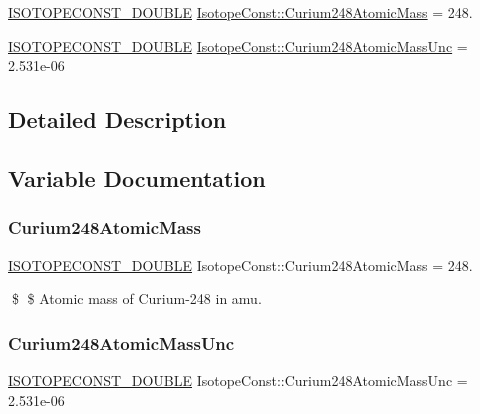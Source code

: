 \begin{DoxyCompactItemize}
\item 
\mbox{\hyperlink{group___isotope_const-_macros_ga8f45a7272ce02c0b4c65c44636ed719a}{I\+S\+O\+T\+O\+P\+E\+C\+O\+N\+S\+T\+\_\+\+D\+O\+U\+B\+LE}} \mbox{\hyperlink{group___isotope_const-_curium-_cm248_ga37872b007439d089090cfbbb61a7fd7b}{Isotope\+Const\+::\+Curium248\+Atomic\+Mass}} = 248.
\item 
\mbox{\hyperlink{group___isotope_const-_macros_ga8f45a7272ce02c0b4c65c44636ed719a}{I\+S\+O\+T\+O\+P\+E\+C\+O\+N\+S\+T\+\_\+\+D\+O\+U\+B\+LE}} \mbox{\hyperlink{group___isotope_const-_curium-_cm248_ga48223966180c01a622d9df44e60d3a36}{Isotope\+Const\+::\+Curium248\+Atomic\+Mass\+Unc}} = 2.\+531e-\/06
\end{DoxyCompactItemize}


\subsection{Detailed Description}


\subsection{Variable Documentation}
\mbox{\label{group___isotope_const-_curium-_cm248_ga37872b007439d089090cfbbb61a7fd7b}} 
\subsubsection{\texorpdfstring{Curium248\+Atomic\+Mass}{Curium248AtomicMass}}
{\footnotesize\ttfamily \mbox{\hyperlink{group___isotope_const-_macros_ga8f45a7272ce02c0b4c65c44636ed719a}{I\+S\+O\+T\+O\+P\+E\+C\+O\+N\+S\+T\+\_\+\+D\+O\+U\+B\+LE}} Isotope\+Const\+::\+Curium248\+Atomic\+Mass = 248.}

\$ \$ Atomic mass of Curium-\/248 in amu. \mbox{\label{group___isotope_const-_curium-_cm248_ga48223966180c01a622d9df44e60d3a36}} 
\subsubsection{\texorpdfstring{Curium248\+Atomic\+Mass\+Unc}{Curium248AtomicMassUnc}}
{\footnotesize\ttfamily \mbox{\hyperlink{group___isotope_const-_macros_ga8f45a7272ce02c0b4c65c44636ed719a}{I\+S\+O\+T\+O\+P\+E\+C\+O\+N\+S\+T\+\_\+\+D\+O\+U\+B\+LE}} Isotope\+Const\+::\+Curium248\+Atomic\+Mass\+Unc = 2.\+531e-\/06}

